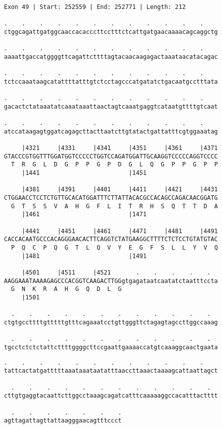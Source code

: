 \documentclass{article}
\begin{document}
\begin{Verbatim}[fontfamily=courier]
Exon 49 | Start: 252559 | End: 252771 | Length: 212

.    .    .    .    .    .    .    .    .    .    .    .    
ctggcagattgatggcaaccacacccttcctttctcattgatgaacaaaacagcaggctg

.    .    .    .    .    .    .    .    .    .    .    .    
aaaattgaccatggggttcagattcttttagtacaacaagagactaaataacatacagac

.    .    .    .    .    .    .    .    .    .    .    .    
tctccaaataagcatattttatttgtctcctagcccatgatatctgacaatgcctttata

.    .    .    .    .    .    .    .    .    .    .    .    
gacactctataaatatcaaataaattaactagtcaaatgaggtcataatgttttgtcaat

.    .    .    .    .    .    .    .    .    .    .    .    
atccataagagtggatcagagcttacttaatcttgtatactgattatttcgtggaaatag

     |4321     |4331     |4341     |4351     |4361     |4371
GTACCCGTGGTTTGGATGGTCCCCCTGGTCCAGATGGATTGCAAGGTCCCCCAGGTCCCC
  T  R  G  L  D  G  P  P  G  P  D  G  L  Q  G  P  P  G  P  P
     |1441                         |1451                    

     |4381     |4391     |4401     |4411     |4421     |4431
CTGGAACCTCCTCTGTTGCACATGGATTTCTTATTACACGCCACAGCCAGACAACGGATG
  G  T  S  S  V  A  H  G  F  L  I  T  R  H  S  Q  T  T  D  A
     |1461                         |1471                    

     |4441     |4451     |4461     |4471     |4481     |4491
CACCACAATGCCCACAGGGAACACTTCAGGTCTATGAAGGCTTTTCTCTCCTGTATGTAC
  P  Q  C  P  Q  G  T  L  Q  V  Y  E  G  F  S  L  L  Y  V  Q
     |1481                         |1491                    

     |4501     |4511     |4521       .    .    .    .    .  
AAGGAAATAAAAGAGCCCACGGTCAAGACTTGGgtgagataatcaatatctaatttccta
  G  N  K  R  A  H  G  Q  D  L  G                           
     |1501                                                  

  .    .    .    .    .    .    .    .    .    .    .    .  
ctgtgccttttgtttttgtttcagaaatcctgttgggttctagagtagccttggccaaag

  .    .    .    .    .    .    .    .    .    .    .    .  
tgcctctctctattcttttggggcttccgaattgaaaaccatgtcaaaggcaactgaata

\end{Verbatim}
\newpage
\begin{Verbatim}[fontfamily=courier]
  .    .    .    .    .    .    .    .    .    .    .    .  
tattcactatgatttttaaataaataatatttaaccttaaactaaaagcattaattagct

  .    .    .    .    .    .    .    .    .    .    .    .  
cttgtgaggtacaattcttggcctaaagcagatcatttcaaaaaggccacatttactttt

  .    .    .    .    .    .    .
agttagattagttattaagggaacagtttccct
\end{Verbatim}
\end{document}
